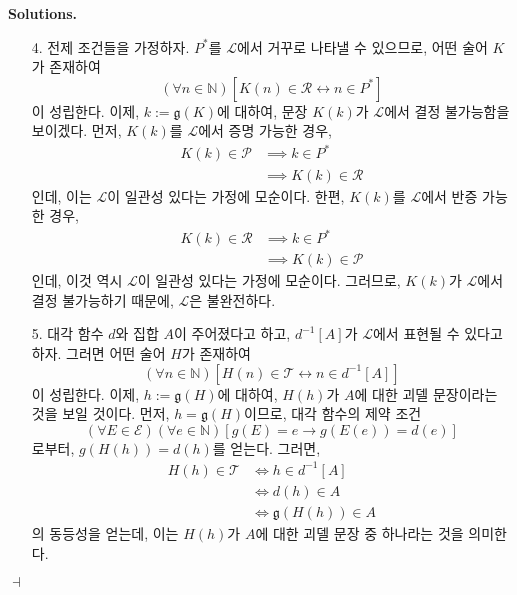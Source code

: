 \documentclass[12pt]{paper}
\newcommand{\gnum}
{ \mathfrak{g}
}
\newenvironment{context}[1][]
{ \noindent \textbf{{#1}.}
}
{ \hfill $ \dashv $
}
\begin{document}
\begin{context}[Solutions]
\begin{enumerate}
      \item[{4.}] 전제 조건들을 가정하자.
      $P^{*}$를 $\mathcal{L}$에서 거꾸로 나타낼 수 있으므로,
      어떤 술어 $K$가 존재하여 $$ \left( \forall n \in \mathbb{N} \right) \left[ K \left( n \right) \in \mathcal{R} \leftrightarrow n \in P^{*} \right] $$이 성립한다.
      이제, $k := \gnum \left( K \right)$에 대하여, 문장 $K \left( k \right)$가 $\mathcal{L}$에서 결정 불가능함을 보이겠다.
      먼저, $K \left( k \right)$를 $\mathcal{L}$에서 증명 가능한 경우,
      \begin{align*}
        K \left( k \right) \in \mathcal{P}
        & \implies k \in P^{*} \\
        & \implies K \left( k \right) \in \mathcal{R}
      \end{align*}
      인데, 이는 $\mathcal{L}$이 일관성 있다는 가정에 모순이다.
      한편, $K \left( k \right)$를 $\mathcal{L}$에서 반증 가능한 경우,
      \begin{align*}
        K \left( k \right) \in \mathcal{R}
        & \implies k \in P^{*} \\
        & \implies K \left( k \right) \in \mathcal{P}
      \end{align*}
      인데, 이것 역시 $\mathcal{L}$이 일관성 있다는 가정에 모순이다.
      그러므로, $K \left( k \right)$가 $\mathcal{L}$에서 결정 불가능하기 때문에, $\mathcal{L}$은 불완전하다.

      \item[{5.}] 대각 함수 $d$와 집합 $A$이 주어졌다고 하고,
      $d^{-1} \left[ A \right]$가 $\mathcal{L}$에서 표현될 수 있다고 하자.
      그러면 어떤 술어 $H$가 존재하여 $$ \left( \forall n \in \mathbb{N} \right) \left[ H \left( n \right) \in \mathcal{T} \leftrightarrow n \in d^{-1} \left[ A \right] \right]$$이 성립한다.
      이제, $h := \gnum \left( H \right)$에 대하여, $H \left( h \right)$가 $A$에 대한 괴델 문장이라는 것을 보일 것이다.
      먼저, $h = \gnum \left( H \right)$이므로,
      대각 함수의 제약 조건 $$ \left( \forall E \in \mathcal{E} \right) \left( \forall e \in \mathbb{N} \right) \left[ g \left( E \right) = e \rightarrow g \left( E \left( e \right) \right) = d \left( e \right) \right] $$로부터,
      $ g \left( H \left( h \right) \right) = d \left( h \right) $를 얻는다.
      그러면,
      \begin{align*}
        H \left( h \right) \in \mathcal{T}
        & \iff h \in d^{-1} \left[ A \right] \\
        & \iff d \left( h \right) \in A \\
        & \iff \gnum \left( H \left( h \right) \right) \in A
      \end{align*}
      의 동등성을 얻는데,
      이는 $H \left( h \right)$가 $A$에 대한 괴델 문장 중 하나라는 것을 의미한다.
      

\end{enumerate}
\end{context}
\end{document}

